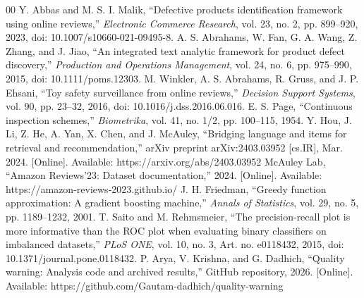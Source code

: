 \documentclass[conference]{IEEEtran}
\begin{document}
{\footnotesize
\begin{thebibliography}{00}
 Y. Abbas and M. S. I. Malik, ``Defective products identification framework using online reviews,'' \emph{Electronic Commerce Research}, vol. 23, no. 2, pp. 899--920, 2023, doi: 10.1007/s10660-021-09495-8.
 A. S. Abrahams, W. Fan, G. A. Wang, Z. Zhang, and J. Jiao, ``An integrated text analytic framework for product defect discovery,'' \emph{Production and Operations Management}, vol. 24, no. 6, pp. 975--990, 2015, doi: 10.1111/poms.12303.
 M. Winkler, A. S. Abrahams, R. Gruss, and J. P. Ehsani, ``Toy safety surveillance from online reviews,'' \emph{Decision Support Systems}, vol. 90, pp. 23--32, 2016, doi: 10.1016/j.dss.2016.06.016.
 E. S. Page, ``Continuous inspection schemes,'' \emph{Biometrika}, vol. 41, no. 1/2, pp. 100--115, 1954.
 Y. Hou, J. Li, Z. He, A. Yan, X. Chen, and J. McAuley, ``Bridging language and items for retrieval and recommendation,'' arXiv preprint arXiv:2403.03952 [cs.IR], Mar. 2024. [Online]. Available: https://arxiv.org/abs/2403.03952
 McAuley Lab, ``Amazon Reviews'23: Dataset documentation,'' 2024. [Online]. Available: https://amazon-reviews-2023.github.io/
 J. H. Friedman, ``Greedy function approximation: A gradient boosting machine,'' \emph{Annals of Statistics}, vol. 29, no. 5, pp. 1189--1232, 2001.
 T. Saito and M. Rehmsmeier, ``The precision-recall plot is more informative than the ROC plot when evaluating binary classifiers on imbalanced datasets,'' \emph{PLoS ONE}, vol. 10, no. 3, Art. no. e0118432, 2015, doi: 10.1371/journal.pone.0118432.
 P. Arya, V. Krishna, and G. Dadhich, ``Quality warning: Analysis code and archived results,'' GitHub repository, 2026. [Online]. Available: https://github.com/Gautam-dadhich/quality-warning
\end{thebibliography}}
\end{document}
